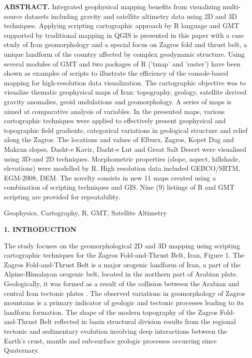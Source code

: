 \documentclass[12pt,a4paper,oneside]{article}
\def \newsection{\vspace{12pt}\textbf}
\def \newpar{\vspace{6pt}}
\begin{document}
{\bf ABSTRACT.} Integrated geophysical mapping benefits from visualizing multi-source datasets including gravity and satellite altimetry data using 2D and 3D techniques. Applying scripting cartographic approach by R language and GMT supported by traditional mapping in QGIS is presented in this paper with a case study of Iran geomorphology and a special focus on Zagros fold and thrust belt, a unique landform of the country affected by complex geodynamic structure. Using several modules of GMT and two packages of R ('tmap' and 'raster') have been shown as examples of scripts to illustrate the efficiency of the console-based mapping for high-resolution data visualization. The cartographic objective was to visualize thematic geophysical maps of Iran: topography, geology, satellite derived gravity anomalies, geoid undulations and geomorphology. A series of maps is aimed at comparative analysis of variables. In the presented maps, various cartographic techniques were applied to effectively present geophysical and topographic field gradients, categorical variations in geological structure and relief along the Zagros. The locations and values of Elburz, Zagros, Kopet Dag and Makran slopes, Dasht-e Kavir, Dasht-e Lut and Great Salt Desert were visualised using 3D-and 2D techniques. Morphometric properties (slope, aspect, hillshade, elevations) were modelled by R. High resolution data included GEBCO/SRTM, EGM-2008, DEM. The novelty consists in new 11 maps created using a combination of scripting techniques and GIS. Nine (9) listings of R and GMT scripting are provided for repeatability.

\newpar {\bf Keywords:} Geophysics, Cartography, R, GMT, Satellite Altimetry


\newsection {1. INTRODUCTION}

\newpar The study focuses on the geomorphological 2D and 3D mapping using scripting cartographic techniques for the Zagros Fold-and-Thrust Belt, Iran, Figure 1. The Zagros Fold-and-Thrust Belt is a major orogenic landform of Iran, a part of the Alpine-Himalayan orogenic belt, located in the northern part of Arabian plate. Geologically, it was formed as a result of the collision between the Arabian and central Iran tectonic plates \cite{Jahani}. The observed variations in geomorphology of Zagros mountains is a primary indicator of geologic and tectonic processes leading to its landform formation. The shape of the modern topography of the Zagros Fold-and-Thrust Belt reflected in basin structural division results from the regional tectonic and sedimentary evolution involving deep interactions between the Earth's crust, mantle and sub-surface geologic processes occurring since Quaternary. 
\end{document}
